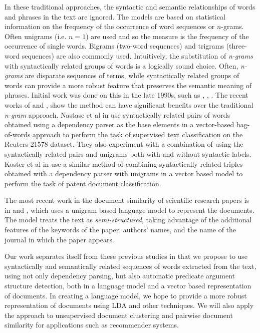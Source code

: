 \documentclass[11pt]{article}
\begin{document}
In these traditional approaches, the syntactic and semantic relationships of words and phrases in the text are ignored. The models are based on statistical information on the frequency of the occurrence of word sequences or $n$-grams. Often unigrams (i.e. $n=1$) are used and so the measure is the frequency of the occurrence of single words. Bigrams (two-word sequences) and trigrams (three-word sequences) are also commonly used. Intuitively, the substitution of \emph{n-grams} with syntactically related groups of words is a logically sound choice. Often, \emph{n-grams} are disparate sequences of terms, while syntactically related groups of words can provide a more robust feature that preserves the semantic meaning of phrases. Initial work was done on this in the late 1990s, such as \cite{Furnkranz1998}, \cite{Dumais1998}, \cite{Shapire1999}. The recent works of \cite{Nastase2007} and \cite{Koster2009}, show the method can have significant benefits over the traditional \emph{n-gram} approach. Nastase et al in \cite{Nastase2007} use syntactically related pairs of words obtained using a dependency parser as the base elements in a vector-based bag-of-words approach to perform the task of supervised text classification on the Reuters-21578 dataset. They also experiment with a combination of using the syntactically related pairs and unigrams both with and without syntactic labels. Koster et al in \cite{Koster2009} use a similar method of combining syntactically related triples obtained with a dependency parser with unigrams in a vector based model to perform the task of patent document classification.

The most recent work in the document similarity of scientific research papers is in \cite{Hurtado2011} and \cite{Hurtado2013}, which uses a unigram based language model to represent the documents. The model treats the text as \emph{semi-structured}, taking advantage of the additional features of the keywords of the paper, authors' names, and the name of the journal in which the paper appears.

Our work separates itself from these previous studies in that we propose to use syntactically and semantically related sequences of words extracted from the text, using not only dependency parsing, but also automatic predicate argument structure detection, both in a language model and a vector based representation of documents. In creating a language model, we hope to provide a more robust representation of documents using LDA and other techniques. We will also apply the approach to unsupervised document clustering and pairwise document similarity for applications such as recommender systems. 
\end{document}
